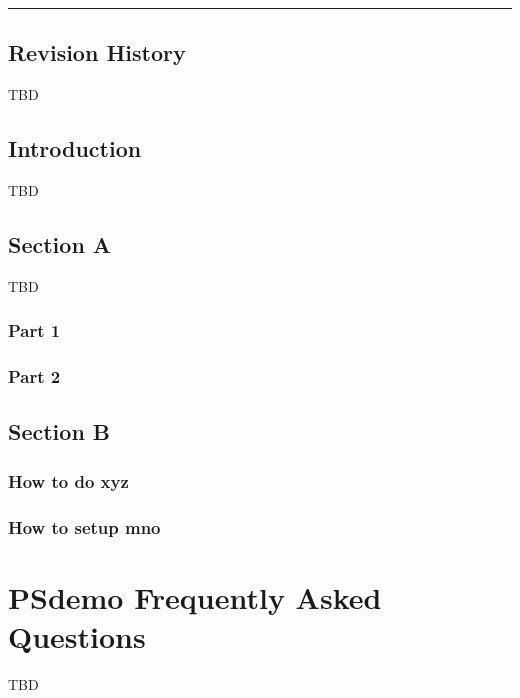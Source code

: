 \documentclass[letterpaper,10pt,english]{sphinxmanual}
\begin{document}
\bigskip\hrule\bigskip



\section{Revision History}
\label{\detokenize{user-guide:revision-history}}
TBD


\section{Introduction}
\label{\detokenize{user-guide:introduction}}
TBD


\section{Section A}
\label{\detokenize{user-guide:section-a}}
TBD


\subsection{Part 1}
\label{\detokenize{user-guide:part-1}}

\subsection{Part 2}
\label{\detokenize{user-guide:part-2}}

\section{Section B}
\label{\detokenize{user-guide:section-b}}

\subsection{How to do xyz}
\label{\detokenize{user-guide:how-to-do-xyz}}

\subsection{How to setup mno}
\label{\detokenize{user-guide:how-to-setup-mno}}

\chapter{PSdemo Frequently Asked Questions}
\label{\detokenize{faq:product-name-frequently-asked-questions}}\label{\detokenize{faq:doc-faq}}\label{\detokenize{faq::doc}}
TBD
\end{document}
